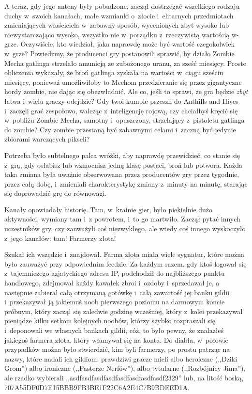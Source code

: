 \documentclass[oneside,polish,11pt,rmheadings]{mwbk}
\begin{document}
A teraz, gdy jego anteny były pobudzone, zaczął dostrzegać wszelkiego rodzaju duchy w~swoich kanałach, małe wzmianki o~złocie i~elitarnych przedmiotach zmieniających właściciela w~zabawny sposób, wycenionych zbyt wysoko lub niewystarczająco wysoko, wszystko nie w~porządku z~rzeczywistą wartością w-grze. Oczywiście, kto wiedział, jaka naprawdę może być wartość czegokolwiek w~grze? Powiedzmy, że producenci gry postanowili sprawić, by działo Zombie Mecha gatlinga strzelało amunicją ze zubożonego uranu, za sześć miesięcy. Proste obliczenia wykazały, że broń gatlinga zyskała na wartości w~ciągu sześciu miesięcy, ponieważ umożliwiłoby to Mechom przedzieranie się przez gigantyczne hordy zombie, nie dając się obezwładnić. Ale co, jeśli to sprawi, że gra będzie \textit{zbyt }łatwa i~wielu graczy odejdzie? Gdy twoi kumple przeszli do Anthills and Hives i~zaczęli grać zespołowo, walcząc z~inteligencję rojową, czy chciałbyś kręcić się w~pobliżu Zombie Mecha, samotny i~opuszczony, strzelający z~pistoletu gatlinga do zombie? Czy zombie przestaną być zabawnymi celami i~zaczną być jedynie zbiorami warczących pikseli?

Potrzeba było subtelnego palca wróżki, aby naprawdę przewidzieć, co stanie się z~grą, gdy osłabisz lub wzmocnisz jedną klasę postaci, broń lub potwora. Każda taka zmiana była uważnie obserwowana przez producentów gry przez tygodnie, przez całą dobę, i~zmieniali charakterystykę zmiany z~minuty na minutę, starając się doprowadzić grę do równowagi.

Kanały opowiadały historię. Tam, w~krainie gier, było piekielnie dużo aktywności, wymiany tam i~z powrotem, i~to go martwiło. Zaczął pytać innych uczestników gry, czy zauważyli coś niezwykłego, ale wtedy coś innego wyskoczyło z~jego kanałów: tam! Farmerzy złota!

Szukał ich wszędzie i~znajdował. Farma złota miała wiele sygnatur, które można było zauważyć przy odpowiednim feedzie. Za każdym razem, gdy ktoś logował się z~tajemniczego azjatyckiego adresu IP, podchodził do najbliższego punktu handlowego, zdejmował każdy kawałek zbroi i~ozdoby i~sprzedawał je, a następnie zabierał całą otrzymaną gotówkę i~całą zawartość jej banku gildii i~przekazywał ją jakiemuś noob pierwszego poziomu na darmowym koncie próbnym, który zaczął się zaledwie godzinę wcześniej, który z~kolei przekazywał pieniądze kilku setkom kolejnych noobów, którzy szybko rozpraszali się i~deponowali we własnych bankach gildii, cóż, to było pewny, że znalazłeś jakiegoś farmera złota, który włamywał się na konta. Do diabła, w~połowie przypadków można było stwierdzić, kim byli farmerzy, po prostu patrząc na nazwy, które nadali ich gildiom: prawdziwi gracze mieli albo heroiczne (,,Dziki Grom'') albo ironiczne (,,Pasterze Nerfów''), albo tytularne (,,Rozbójnicy Jima''), ale rzadko wybierali ,,asdfasdfasdfasdfasdfasdfasdfasdf2329'' lub, na litość boską, 707A\-55DF\-0D7E\-15BB\-B9FB\-3BE1\-F22C\-6A\-2E\-4C\-7B\-9B\-DE\-ED\-1A.
\end{document}
